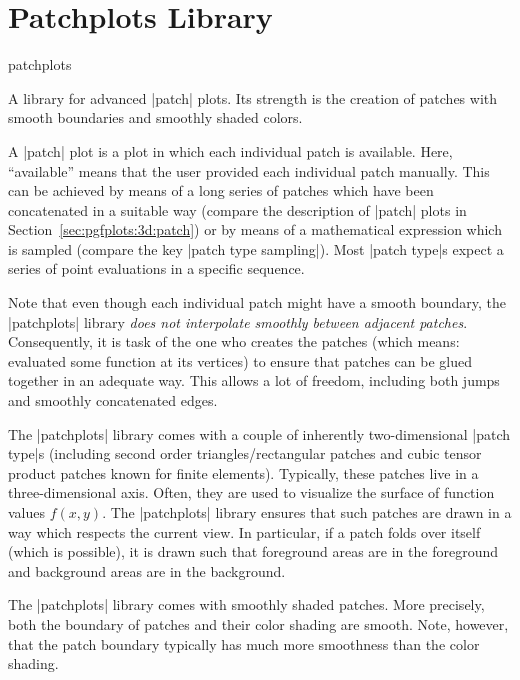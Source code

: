 
\section{Patchplots Library}
\label{sec:lib:patchplots}

{
\def\pgfplotsmanualcurlibrary{patchplots}

\begin{pgfplotslibrary}{patchplots}

A library for advanced |patch| plots. Its strength is the creation of patches
with smooth boundaries and smoothly shaded colors.

A |patch| plot is a plot in which each individual patch is available. Here,
``available'' means that the user provided each individual patch manually. This
can be achieved by means of a long series of patches which have been
concatenated in a suitable way (compare the description of |patch| plots in
Section~\ref{sec:pgfplots:3d:patch}) or by means of a mathematical expression
which is sampled (compare the key |patch type sampling|). Most |patch type|s
expect a series of point evaluations in a specific sequence.

Note that even though each individual patch might have a smooth boundary, the
|patchplots| library \emph{does not interpolate smoothly between adjacent
patches}. Consequently, it is task of the one who creates the patches (which
means: evaluated some function at its vertices) to ensure that patches can be
glued together in an adequate way. This allows a lot of freedom, including both
jumps and smoothly concatenated edges.

The |patchplots| library comes with a couple of inherently two-dimensional
|patch type|s (including second order triangles/rectangular patches and cubic
tensor product patches known for finite elements). Typically, these patches
live in a three-dimensional axis. Often, they are used to visualize the surface
of function values $f(x,y)$. The |patchplots| library ensures that such patches
are drawn in a way which respects the current view. In particular, if a patch
folds over itself (which is possible), it is drawn such that foreground areas
are in the foreground and background areas are in the background.

The |patchplots| library comes with smoothly shaded patches. More precisely,
both the boundary of patches and their color shading are smooth. Note, however,
that the patch boundary typically has much more smoothness than the color
shading.


\end{pgfplotslibrary}}
